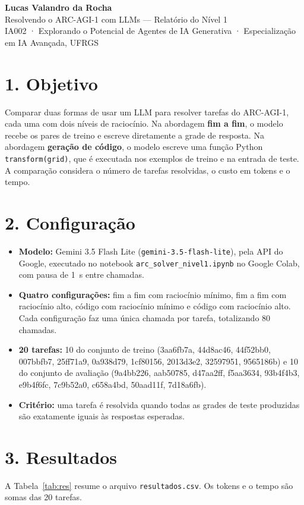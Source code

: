 \documentclass[11pt,a4paper]{article}
\begin{document}
\begin{center}
{\Large\bfseries Lucas Valandro da Rocha}\\[4pt]
{\large Resolvendo o ARC-AGI-1 com LLMs --- Relatório do Nível 1}\\[2pt]
IA002 · Explorando o Potencial de Agentes de IA Generativa · Especialização em IA Avançada, UFRGS
\end{center}

\section*{1. Objetivo}
Comparar duas formas de usar um LLM para resolver tarefas do ARC-AGI-1, cada uma com dois níveis
de raciocínio. Na abordagem \textbf{fim a fim}, o modelo recebe os pares de treino e escreve
diretamente a grade de resposta. Na abordagem \textbf{geração de código}, o modelo escreve uma
função Python \texttt{transform(grid)}, que é executada nos exemplos de treino e na entrada de
teste. A comparação considera o número de tarefas resolvidas, o custo em tokens e o tempo.

\section*{2. Configuração}
\begin{itemize}
  \item \textbf{Modelo:} Gemini 3.5 Flash Lite (\texttt{gemini-3.5-flash-lite}), pela API do Google,
        executado no notebook \texttt{arc\_solver\_nivel1.ipynb} no Google Colab, com pausa de 1~s entre chamadas.
  \item \textbf{Quatro configurações:} fim a fim com raciocínio mínimo, fim a fim com raciocínio alto,
        código com raciocínio mínimo e código com raciocínio alto. Cada configuração faz uma única
        chamada por tarefa, totalizando 80 chamadas.
  \item \textbf{20 tarefas:} 10 do conjunto de treino (3aa6fb7a, 44d8ac46, 44f52bb0, 007bbfb7, 25ff71a9,
        0a938d79, 1cf80156, 2013d3e2, 32597951, 9565186b) e 10 do conjunto de avaliação (9a4bb226,
        aab50785, d47aa2ff, f5aa3634, 93b4f4b3, e9b4f6fc, 7c9b52a0, c658a4bd, 50aad11f, 7d18a6fb).
  \item \textbf{Critério:} uma tarefa é resolvida quando todas as grades de teste produzidas são
        exatamente iguais às respostas esperadas.
\end{itemize}

\section*{3. Resultados}
A Tabela~\ref{tab:res} resume o arquivo \texttt{resultados.csv}. Os tokens e o tempo são somas das 20 tarefas.
\end{document}
